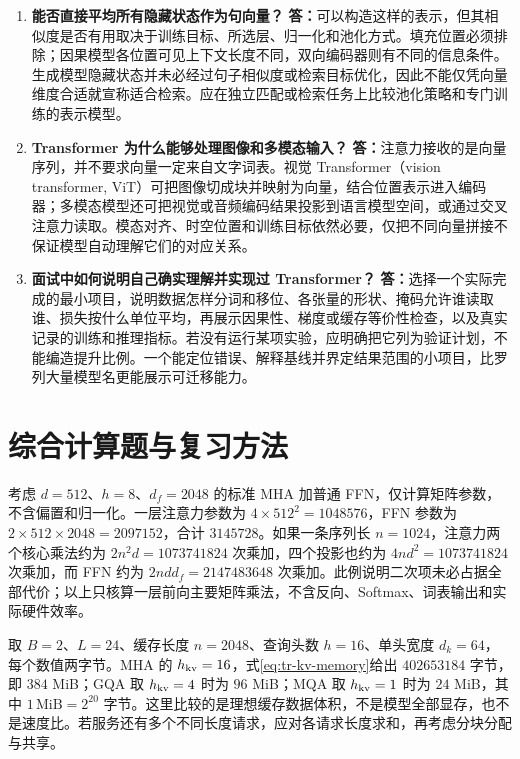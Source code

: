 \documentclass[UTF8,12pt,a4paper,fontset=fandol]{ctexart}
\begin{document}
\begin{enumerate}[resume*=trquestions]
\item \textbf{能否直接平均所有隐藏状态作为句向量？}
\textbf{答：}可以构造这样的表示，但其相似度是否有用取决于训练目标、所选层、归一化和池化方式。填充位置必须排除；因果模型各位置可见上下文长度不同，双向编码器则有不同的信息条件。生成模型隐藏状态并未必经过句子相似度或检索目标优化，因此不能仅凭向量维度合适就宣称适合检索。应在独立匹配或检索任务上比较池化策略和专门训练的表示模型。

\item \textbf{Transformer 为什么能够处理图像和多模态输入？}
\textbf{答：}注意力接收的是向量序列，并不要求向量一定来自文字词表。视觉 Transformer（vision transformer, ViT）可把图像切成块并映射为向量，结合位置表示进入编码器\cite{dosovitskiy2020}；多模态模型还可把视觉或音频编码结果投影到语言模型空间，或通过交叉注意力读取。模态对齐、时空位置和训练目标依然必要，仅把不同向量拼接不保证模型自动理解它们的对应关系。

\item \textbf{面试中如何说明自己确实理解并实现过 Transformer？}
\textbf{答：}选择一个实际完成的最小项目，说明数据怎样分词和移位、各张量的形状、掩码允许谁读取谁、损失按什么单位平均，再展示因果性、梯度或缓存等价性检查，以及真实记录的训练和推理指标。若没有运行某项实验，应明确把它列为验证计划，不能编造提升比例。一个能定位错误、解释基线并界定结果范围的小项目，比罗列大量模型名更能展示可迁移能力。
\end{enumerate}

\section{综合计算题与复习方法}
\label{sec:tr-exercises}

\begin{example}[一层参数量与训练计算的核算]
考虑 $d=512$、$h=8$、$d_f=2048$ 的标准 MHA 加普通 FFN，仅计算矩阵参数，不含偏置和归一化。一层注意力参数为 $4\times512^2=1048576$，FFN 参数为 $2\times512\times2048=2097152$，合计 $3145728$。如果一条序列长 $n=1024$，注意力两个核心乘法约为 $2n^2d=1073741824$ 次乘加，四个投影也约为 $4nd^2=1073741824$ 次乘加，而 FFN 约为 $2ndd_f=2147483648$ 次乘加。此例说明二次项未必占据全部代价；以上只核算一层前向主要矩阵乘法，不含反向、Softmax、词表输出和实际硬件效率。
\end{example}

\begin{example}[三种缓存配置的比较]
取 $B=2$、$L=24$、缓存长度 $n=2048$、查询头数 $h=16$、单头宽度 $d_k=64$，每个数值两字节。MHA 的 $h_{\rm kv}=16$，式\eqref{eq:tr-kv-memory}给出 $402653184$ 字节，即 $384$ MiB；GQA 取 $h_{\rm kv}=4$ 时为 $96$ MiB；MQA 取 $h_{\rm kv}=1$ 时为 $24$ MiB，其中 $1\,\mathrm{MiB}=2^{20}$ 字节。这里比较的是理想缓存数据体积，不是模型全部显存，也不是速度比。若服务还有多个不同长度请求，应对各请求长度求和，再考虑分块分配与共享。
\end{example}
\end{document}
